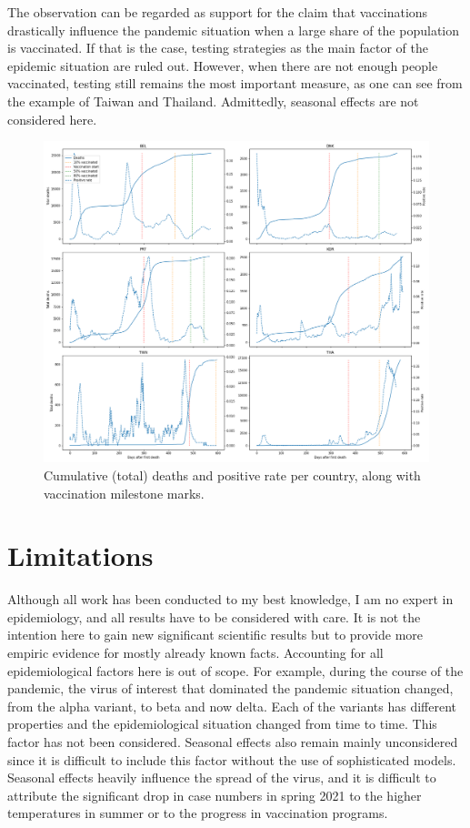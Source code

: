 \documentclass[a4paper,11pt]{article}
\begin{document}
The observation can be regarded as support for the claim that vaccinations drastically influence the pandemic situation when a large share of the population is vaccinated. If that is the case, testing strategies as the main factor of the epidemic situation are ruled out. However, when there are not enough people vaccinated, testing still remains the most important measure, as one can see from the example of Taiwan and Thailand. Admittedly, seasonal effects are not considered here.


\begin{figure}[htb]
    \centering
    \includegraphics[width=\textwidth]{figures/deaths_posrate_6.png}
    \caption{Cumulative (total) deaths and positive rate per country, along with vaccination milestone marks. }
    \label{fig:deaths_pos_rate}
\end{figure}


\section{Limitations}
Although all work has been conducted to my best knowledge, I am no expert in epidemiology, and all results have to be considered with care. It is not the intention here to gain new significant scientific results but to provide more empiric evidence for mostly already known facts.
Accounting for all epidemiological factors here is out of scope. For example, during the course of the pandemic, the virus of interest that dominated the pandemic situation changed, from the alpha variant, to beta and now delta. Each of the variants has different properties and the epidemiological situation changed from time to time. This factor has not been considered. Seasonal effects also remain mainly unconsidered since it is difficult to include this factor without the use of sophisticated models. Seasonal effects heavily influence the spread of the virus, and it is difficult to attribute the significant drop in case numbers in spring 2021 to the higher temperatures in summer or to the progress in vaccination programs.
\end{document}
